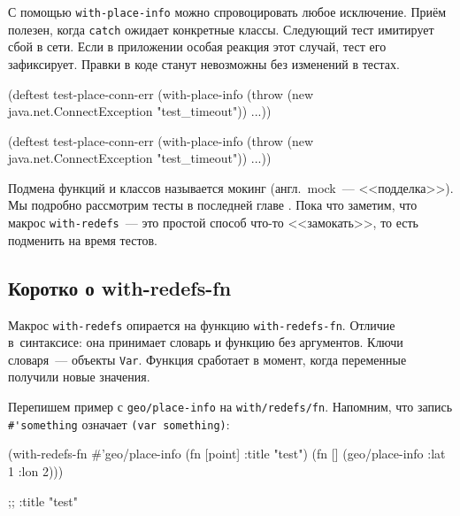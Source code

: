 \fi

С помощью \verb|with-place-info| можно спровоцировать любое исключение. Приём
полезен, когда \verb|catch| ожидает конкретные классы. Следующий тест имитирует
сбой в сети. Если в приложении особая реакция этот случай, тест его
зафиксирует. Правки в коде станут невозможны без изменений в тестах.


\ifnarrow

\begin{english}
  \begin{clojure}
(deftest test-place-conn-err
  (with-place-info
    (throw (new java.net.ConnectException
             "test_timeout"))
    ...))
  \end{clojure}
\end{english}

\else

\begin{english}
  \begin{clojure}
(deftest test-place-conn-err
  (with-place-info
    (throw (new java.net.ConnectException "test_timeout"))
    ...))
  \end{clojure}
\end{english}

\fi


Подмена функций и классов называется мокинг (англ.~mock~--- <<подделка>>). Мы
подробно рассмотрим тесты в последней главе . Пока что
заметим, что макрос \verb|with-redefs|~--- это простой способ что-то <<замокать>>,
то есть подменить на время тестов.

\subsection{Коротко о with-redefs-fn}


Макрос \verb|with-redefs| опирается на функцию \verb|with-redefs-fn|. Отличие
в~синтаксисе: она принимает словарь и функцию без аргументов. Ключи словаря~---
объекты \verb|Var|. Функция сработает в момент, когда переменные получили новые
значения.

Перепишем пример с \verb|geo/place-info| на \texttt{with\-/redefs\-/fn}. Напомним, что
запись \verb|#'|\texttt{something} означает \verb|(var something)|:

\ifnarrow

\begin{english}
  \begin{clojure}
(with-redefs-fn
  {#'geo/place-info (fn [point]
                      {:title "test"})}
  (fn []
    (geo/place-info {:lat 1 :lon 2})))

;; {:title "test"}
  \end{clojure}
\end{english}

